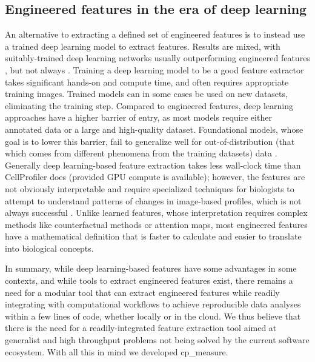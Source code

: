 \documentclass{article}
\begin{document}
\subsection{Engineered features in the era of deep learning}
\label{sec:org9dc3dfa}
An alternative to extracting a defined set of engineered features is to instead use a trained deep learning model to extract features. Results are mixed, with suitably-trained deep learning networks usually outperforming engineered features \cite{lafargeCapturingSingleCellPhenotypic2019,moshkovLearningRepresentationsImagebased2022,chowPredictingDrugPolypharmacology2022,wolfSCANPYLargescaleSinglecell2018}, but not always \cite{tangMorphologicalProfilingDrug2024,kimSelfsupervisionAdvancesMorphological2023}. Training a deep learning model to be a good feature extractor takes significant hands-on and compute time, and often requires appropriate training images. Trained models can in some cases be used on new datasets, eliminating the training step. Compared to engineered features, deep learning approaches have a higher barrier of entry, as most models require either annotated data or a large and high-quality dataset. Foundational models, whose goal is to lower this barrier, fail to generalize well for out-of-distribution (that which comes from different phenomena from the training datasets) data \cite{azadFoundationalModelsMedical2023}. Generally deep learning-based feature extraction takes less wall-clock time than CellProfiler does (provided GPU compute is available); however, the features are not obviously interpretable and require specialized techniques for biologists to attempt to understand patterns of changes in image-based profiles, which is not always successful \citep{moenDeepLearningCellular2019}.  Unlike learned features, whose interpretation requires complex methods like counterfactual methods or attention maps, most engineered features have a mathematical definition that is faster to calculate and easier to translate into biological concepts. 

In summary, while deep learning-based features have some advantages in some contexts, and while tools to extract engineered features exist, there remains a need for a modular tool that can extract engineered features while readily integrating with computational workflows to achieve reproducible data analyses within a few lines of code, whether locally or in the cloud. We thus believe that there is the need for a readily-integrated feature extraction tool aimed at generalist and high throughput problems not being solved by the current software ecosystem. With all this in mind we developed cp\_measure.
\end{document}
